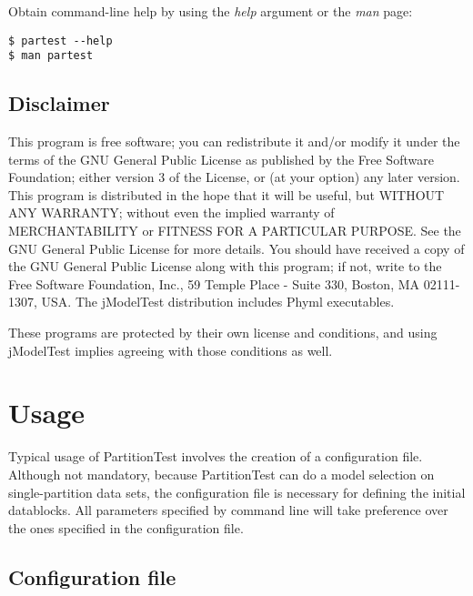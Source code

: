 \documentclass[11pt,twoside,a4paper]{article}
\begin{document}
Obtain command-line help by using the {\it help} argument or the {\it man} page:

\begin{verbatim}
$ partest --help
$ man partest
\end{verbatim}



\subsection{Disclaimer}

This program is free software; you can redistribute it and/or modify it under the terms of the GNU General Public License as published by the Free Software Foundation; either version 3 of the License, or (at your option) any later version. This program is distributed in the hope that it will be useful, but WITHOUT ANY WARRANTY; without even the implied warranty of MERCHANTABILITY or FITNESS FOR A PARTICULAR PURPOSE. See the GNU General Public License for more details. You should have received a copy of the GNU General Public License along with this program; if not, write to the Free Software Foundation, Inc., 59 Temple Place - Suite 330, Boston, MA 02111-1307, USA. The jModelTest distribution includes Phyml executables.

These programs are protected by their own license and conditions, and using jModelTest implies agreeing with those conditions as well. 

\clearpage
\section{Usage}

Typical usage of PartitionTest involves the creation of a configuration file.
Although not mandatory, because PartitionTest can do a model selection on single-partition
data sets, the configuration file is necessary for defining the initial datablocks.
All parameters specified by command line will take preference over the ones specified in
the configuration file.

\subsection{Configuration file}
\end{document}
